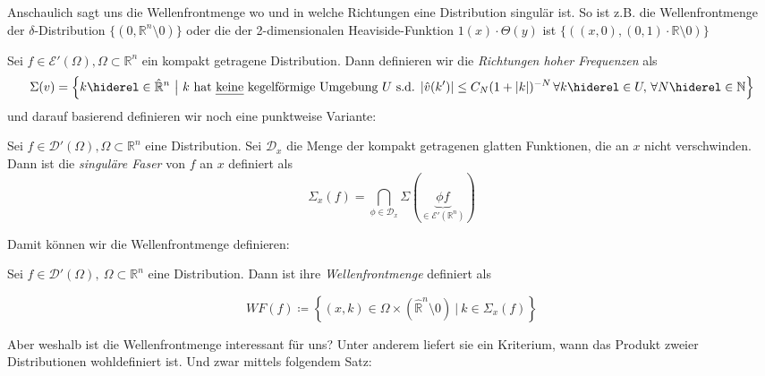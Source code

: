 Anschaulich sagt uns die Wellenfrontmenge wo und in welche Richtungen eine Distribution singulär ist. So ist z.B. die Wellenfrontmenge der $\delta$-Distribution $\{(0, \mathbb{R}^n \setminus 0)\}$ oder die der 2-dimensionalen Heaviside-Funktion $1(x)\cdot\Theta(y)$ ist $\{((x,0),(0,1)\cdot \mathbb{R}\setminus 0)\}$

\begin{definition}
\label{def:high_frequency_set}
Sei $f \in \mathcal{E}'(\Omega), \Omega \subset \mathbb{R}^n$ ein kompakt getragene Distribution. Dann definieren wir die \emph{Richtungen hoher Frequenzen} als
\begin{dmath*}
\Sigma (v) = \left\{k \hiderel \in \hat{\mathbb{R}}^n ~\big|~ k \textrm{ hat \emph{keine} kegelförmige Umgebung $U$ s.d. } \\ |\hat v (k')| \leq C_N(1+|k|)^{-N} \, \forall k \hiderel\in U,\, \forall N  \hiderel\in \mathbb{N} \right\}
\end{dmath*}
und darauf basierend definieren wir noch eine punktweise Variante:

Sei $f \in \mathcal{D}'(\Omega), \Omega \subset \mathbb{R}^n$ eine Distribution.
Sei $\mathcal{D}_x$ die Menge der kompakt getragenen glatten Funktionen, die an $x$ nicht verschwinden.
Dann ist die \emph{singuläre Faser} von $f$ an $x$ definiert als
\begin{dmath*}
\Sigma_x (f) = \bigcap \limits_{\phi \in \mathcal{D}_x} \Sigma (\underbrace{\phi f}_{\in \mathcal{E}'(\mathbb{R}^n)})
\end{dmath*}
\end{definition}

Damit können wir die Wellenfrontmenge definieren:

\begin{definition}[Wellenfrontmenge]
\label{def:wavefrontset}
Sei $f \in \mathcal{D}'(\Omega), ~\Omega \subset \mathbb{R}^n$ eine Distribution. Dann ist ihre \emph{Wellenfrontmenge} definiert als

\begin{equation*}
WF(f)  \coloneqq \left\{
	(x,k) \in \Omega \times (\hat{\mathbb{R}}^n \setminus 0)
	~\Big|~ k \in \Sigma_x(f)
	\right\}
\end{equation*}
\end{definition}

Aber weshalb ist die Wellenfrontmenge interessant für uns? Unter anderem liefert sie ein Kriterium, wann das Produkt zweier Distributionen wohldefiniert ist. Und zwar mittels folgendem Satz:

